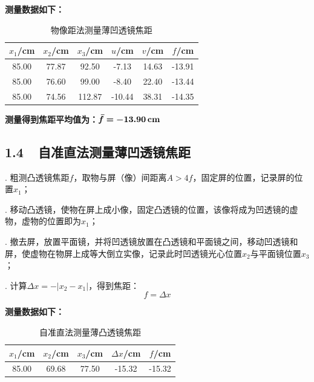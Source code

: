 \documentclass{ctexbook}
\begin{document}
    \noindent \textbf{测量数据如下：}
    \begin{table}[ht!]
        \begin{center}
            \begin{tabular}{|c|c|c|c|c|c|}
                \hline
                $x_1$/cm & $x_2$/cm & $x_3$/cm & $u$/cm & $v$/cm & $f$/cm \\
                \hline
                85.00 & 77.87 & 92.50 & -7.13 & 14.63 & -13.91 \\
                \hline
                85.00 & 76.60 & 99.00 & -8.40 & 22.40 & -13.44 \\
                \hline
                85.00 & 74.56 & 112.87 & -10.44 & 38.31 & -14.35 \\
                \hline
            \end{tabular}
            \caption{物像距法测量薄凹透镜焦距}
        \end{center}
    \end{table}

	\noindent \textbf{测量得到焦距平均值为：}$\bm{\bar{f} = -} \textbf{13.90\,cm}$

    \bigskip
    \subsection*{ 1.4\ \ 自准直法测量薄凹透镜焦距}

    . 粗测凸透镜焦距$f$，取物与屏（像）间距离$A>4f$，固定屏的位置，记录屏的位置$x_1$；

    . 移动凸透镜，使物在屏上成小像，固定凸透镜的位置，该像将成为凹透镜的虚物，虚物的位置即为$x_1$；

    . 撤去屏，放置平面镜，并将凹透镜放置在凸透镜和平面镜之间，移动凹透镜和屏，使虚物在物屏上成等大倒立实像，记录此时凹透镜光心位置$x_2$与平面镜位置$x_3$；

    . 计算$\Delta x = -|x_2 - x_1|$，得到焦距：
    \[f = \Delta x\]

    \noindent \textbf{测量数据如下：}
    \begin{table}[ht!]
        \begin{center}
            \begin{tabular}{|c|c|c|c|c|}
                \hline
                $x_1$/cm & $x_2$/cm & $x_3$/cm & $\Delta x$/cm & $f$/cm \\
                \hline
                85.00 & 69.68 & 77.50 & -15.32 & -15.32 \\
                \hline
            \end{tabular}
            \caption{自准直法测量薄凸透镜焦距}
        \end{center}
    \end{table}
\end{document}
